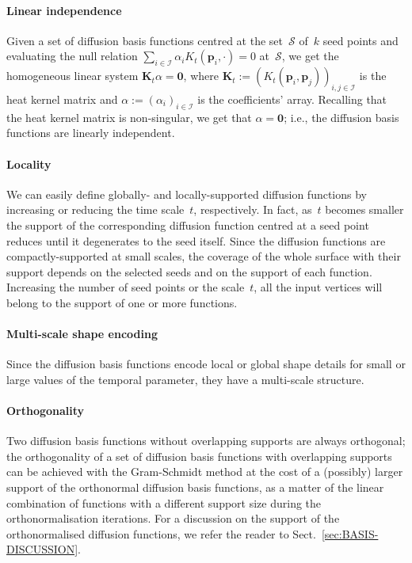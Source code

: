 \documentclass[acmtog,authorversion]{acmart}
\begin{document}
\paragraph*{Linear independence}
Given a set of diffusion basis functions centred at the set~$\mathcal{S}$ of~$k$ seed points and evaluating the null relation \mbox{$\sum_{i\in\mathcal{I}}\alpha_{i}K_{t}(\mathbf{p}_{i},\cdot)=0$} at~$\mathcal{S}$, we get the homogeneous linear system \mbox{$\mathbf{K}_{t}\alpha=\mathbf{0}$}, where \mbox{$\mathbf{K}_{t}:=(K_{t}(\mathbf{p}_{i},\mathbf{p}_{j}))_{i,j\in\mathcal{I}}$} is the heat kernel matrix and \mbox{$\alpha:=(\alpha_{i})_{i\in\mathcal{I}}$} is the coefficients' array. Recalling that the heat kernel matrix is non-singular, we get that \mbox{$\alpha=\mathbf{0}$}; i.e., the diffusion basis functions are linearly independent.

\paragraph*{Locality} 
We can easily define globally- and locally-supported diffusion functions by increasing or reducing the time scale~$t$, respectively. In fact, as~$t$ becomes smaller the support of the corresponding diffusion function centred at a seed point reduces until it degenerates to the seed itself. Since the diffusion functions are compactly-supported at small scales, the coverage of the whole surface with their support depends on the selected seeds and on the support of each function. Increasing the number of seed points or the scale~$t$, all the input vertices will belong to the support of one or more functions.

\paragraph*{Multi-scale shape encoding} 
Since the diffusion basis functions encode local or global shape details for small or large values of the temporal parameter, they have a multi-scale structure.

\paragraph*{Orthogonality}
Two diffusion basis functions without overlapping supports are always orthogonal; the orthogonality of a set of diffusion basis functions with overlapping supports can be achieved with the Gram-Schmidt method at the cost of a (possibly) larger support of the orthonormal diffusion basis functions, as a matter of the linear combination of functions with a different support size during the orthonormalisation iterations. For a discussion on the support of the orthonormalised diffusion functions, we refer the reader to Sect.~\ref{sec:BASIS-DISCUSSION}.
\end{document}
